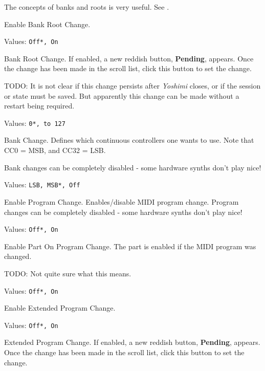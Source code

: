    \setcounter{ItemCounter}{0}      %

   The concepts of banks and roots is very useful.
   See .

   Enable Bank Root Change.

   Values: \texttt{Off*, On}

   Bank Root Change.
   If enabled, a new reddish button, \textbf{Pending}, appears.
   Once the change has been made in the scroll list, click this button
   to set the change.

   TODO:
   It is not clear if this change persists after \textsl{Yoshimi} closes, or
   if the session or state must be saved.
   But apparently this change can be made without a restart being required.

   Values: \texttt{0*, to 127}

   Bank Change.
   Defines which continuous controllers one wants to use.
   Note that CC0 = MSB, and CC32 = LSB.

   Bank changes can be completely disabled - some hardware
   synths don't play nice!

   Values: \texttt{LSB, MSB*, Off}

   Enable Program Change.
   Enables/disable MIDI program change.
   Program changes can be completely disabled - some hardware synths don't
   play nice!

   Values: \texttt{Off*, On}

   Enable Part On Program Change.
   The part is enabled if the MIDI program was changed.

   TODO:  Not quite sure what this means.

   Values: \texttt{Off*, On}

   Enable Extended Program Change.

   Values: \texttt{Off*, On}

   Extended Program Change.
   If enabled, a new reddish button, \textbf{Pending}, appears.
   Once the change has been made in the scroll list, click this button
   to set the change.

